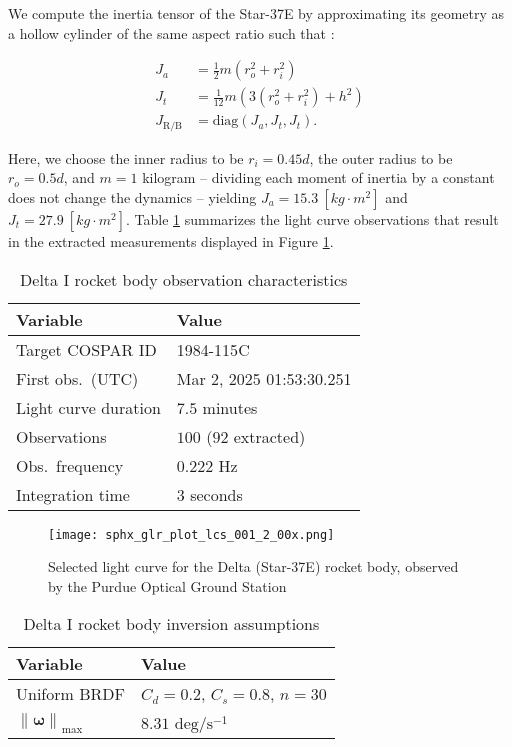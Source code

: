 \documentclass[a4paper,twocolumn]{spaceDebrisC} %
\newcommand{\vctr}[1]{\bm{#1}}
\newcommand{\norm}[1]{\left\lVert#1\right\rVert}
\newcommand{\figbig}[0]{0.5\textwidth}
\begin{document}
We compute the inertia tensor of the Star-37E by approximating its geometry as a hollow cylinder of the same aspect ratio such that \cite{serway2019}:

\begin{align}
 J_a &= \frac{1}{2} m \left(r_o^2+r_i^2\right) \\
 J_t &= \frac{1}{12} m \left(3 \left(r_o^2+r_i^2\right) + h^2\right) \\
 J_\text{R/B} &= \text{diag} \left(J_a, J_t, J_t\right).
\end{align}

Here, we choose the inner radius to be $r_i=0.45d$, the outer radius to be $r_o=0.5d$, and $m=1$ kilogram -- dividing each moment of inertia by a constant does not change the dynamics -- yielding $J_a = 15.3 \: [kg \cdot m^2]$ and $J_t = 27.9 \: [kg \cdot m^2]$. Table \ref{tb:case1_in} summarizes the light curve observations that result in the extracted measurements displayed in Figure \ref{fig:rb_lc_obs}.

\begin{table}[H]
  \centering
  \caption{Delta I rocket body observation characteristics}
  \vspace*{6pt}
  \begin{tabular}{|l|l|}
  \hline
  \textbf{Variable} & \textbf{Value} \\ \hline
 Target COSPAR ID & 1984-115C \\ \hline
 First obs.\ (UTC) & Mar 2, 2025 01:53:30.251 \\ \hline
 Light curve duration & $7.5$ minutes \\ \hline
 Observations & $100$ ($92$ extracted) \\ \hline
 Obs.\ frequency & $0.222$ Hz \\ \hline
 Integration time & $3$ seconds \\ \hline
  \end{tabular}
  \label{tb:case1_in}
\end{table}

\begin{figure}[H]
  \centering
  \texttt{[image: sphx\_glr\_plot\_lcs\_001\_2\_00x.png]}
  \caption{Selected light curve for the Delta (Star-37E) rocket body, observed by the Purdue Optical Ground Station}
  \label{fig:rb_lc_obs}
\end{figure}

\begin{table}[H]
  \centering
  \caption{Delta I rocket body inversion assumptions}
  \vspace*{6pt}
  \begin{tabular}{|l|l|}
  \hline
  \textbf{Variable} & \textbf{Value} \\ \hline
 Uniform BRDF & $C_d=0.2$, $C_s=0.8$, $n=30$ \\ \hline
  $\norm{\vctr{\omega}}_\text{max}$ & $8.31$ $\text{deg} / \text{s}^{-1}$ \\ \hline
  \end{tabular}
  \label{tb:case1_ass}
\end{table}
\end{document}

